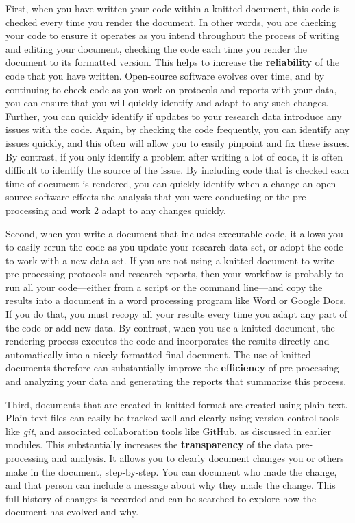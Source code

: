 \documentclass[]{tufte-book}
\begin{document}
First, when you have written your code within a knitted document, this code is
checked every time you render the document. In other words, you are checking
your code to ensure it operates as you intend throughout the process of writing
and editing your document, checking the code each time you render the document
to its formatted version. This helps to increase the \textbf{reliability} of the code
that you have written. Open-source software evolves over time, and by continuing
to check code as you work on protocols and reports with your data, you can
ensure that you will quickly identify and adapt to any such changes. Further,
you can quickly identify if updates to your research data introduce any issues
with the code. Again, by checking the code frequently, you can identify any
issues quickly, and this often will allow you to easily pinpoint and fix these
issues. By contrast, if you only identify a problem after writing a lot of code,
it is often difficult to identify the source of the issue. By including code
that is checked each time of document is rendered, you can quickly identify when
a change an open source software effects the analysis that you were conducting
or the pre-processing and work 2 adapt to any changes quickly.

Second, when you write a document that includes executable code, it allows you
to easily rerun the code as you update your research data set, or adopt the code
to work with a new data set. If you are not using a knitted document to write
pre-processing protocols and research reports, then your workflow is probably to
run all your code---either from a script or the command line---and copy the
results into a document in a word processing program like Word or Google Docs.
If you do that, you must recopy all your results every time you adapt any part
of the code or add new data. By contrast, when you use a knitted document, the
rendering process executes the code and incorporates the results directly and
automatically into a nicely formatted final document. The use of knitted
documents therefore can substantially improve the \textbf{efficiency} of
pre-processing and analyzing your data and generating the reports that summarize
this process.

Third, documents that are created in knitted format are created using plain
text. Plain text files can easily be tracked well and clearly using version
control tools like \emph{git}, and associated collaboration tools like GitHub, as
discussed in earlier modules. This substantially increases the \textbf{transparency}
of the data pre-processing and analysis. It allows you to clearly document
changes you or others make in the document, step-by-step. You can document who
made the change, and that person can include a message about why they made the
change. This full history of changes is recorded and can be searched to explore
how the document has evolved and why.
\end{document}
